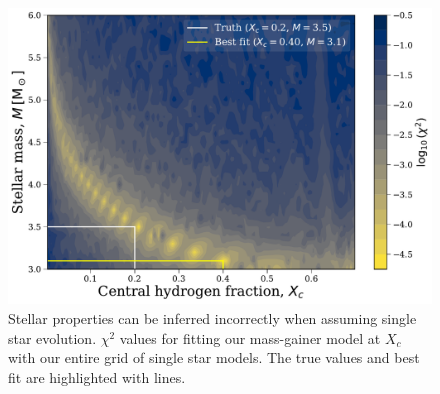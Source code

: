 \documentclass[twocolumn, twocolappendix, oneside]{aastex631}
\makeatletter
\newcommand{\unit}[1]{%
    \,\mathrm{#1}\checknextarg}
\newcommand{\checknextarg}{\@ifnextchar\bgroup{\gobblenextarg}{}}
\newcommand{\gobblenextarg}[1]{\,\mathrm{#1}\@ifnextchar\bgroup{\gobblenextarg}{}}
\newif\ifstartedinmathmode
\newcommand{\msun}{%
  \relax\ifmmode\startedinmathmodetrue\else\startedinmathmodefalse\fi
  {\ifstartedinmathmode\unit{M_{\odot}}\else$\unit{M_{\odot}}$\fi}\xspace%
}
\newif\ifstartedinmathmode
\makeatother
\begin{document}
\begin{figure}[tb]
    \centering
    \includegraphics[width=\columnwidth]{figures/chi2_xc_0.2.pdf}
    \caption{Stellar properties can be inferred incorrectly when assuming single star evolution. $\chi^2$ values for fitting our mass-gainer model at $X_c$ with our entire grid of single star models. The true values and best fit are highlighted with lines.}
    \label{fig:chi2_xc_0.2}
\end{figure}

\end{document}
